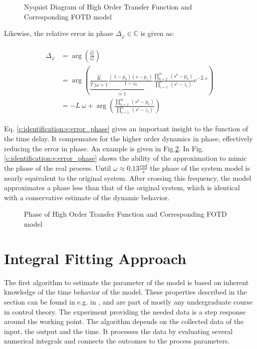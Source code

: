 \begin{figure}[H]
  \centering
  \def\svgwidth{\textwidth}
  
  \caption{Nyquist Diagram of High Order Transfer Function and Corresponding FOTD model}
  \label{c:identification:f:nyquist_fotd}
\end{figure}


Likewise, the relative error in phase $\Delta_\varphi \in \mathbb{C}$ is given as:

\begin{align}
\begin{split}
\Delta_\varphi &= \arg\left(\frac{\hat{G}}{G}\right) \\
&= \arg\left(\underbrace{\frac{\hat{K}}{\hat{T}~j\omega+1} \frac{\left(\ 1-p_0 \right)\left( s- p_1 \right)}{1-z_0}}_{\approx 1} \frac{\prod_{k=2}^m~(s^k-p_k)}{\prod_{i=1}^n~(s^i-z_i)}e^{-\hat{L}~s} \right)\\
&= -L~\omega + \arg\left(\frac{\prod_{k=2}^m~(s^k-p_k)}{\prod_{i=1}^n~(s^i-z_i)}\right)
\end{split}
\label{c:identification:e:error_phase}
\end{align}

Eq. \ref{c:identification:e:error_phase} gives an important insight to the function of the time delay. It compensates for the higher order dynamics in phase, effectively reducing the error in phase. An example is given in Fig.\ref{c:identification:f:phase_fotd}. In Fig. \ref{c:identification:e:error_phase} shows the ability of the approximation to mimic the phase of the real process. Until $\omega \approx 0.13 \frac{rad}{s}$ the phase of the system model is nearly equivalent to the original system. After crossing this frequency, the model approximates a phase less than that of the original system, which is identical with a conservative estimate of the dynamic behavior.

\begin{figure}[H]
  \centering
  \def\svgwidth{\textwidth}
  
  \caption{Phase of High Order Transfer Function and Corresponding FOTD model}
  \label{c:identification:f:phase_fotd}
\end{figure}


\section{Integral Fitting Approach}
\label{c:identification:s:area}

The first algorithm to estimate the parameter of the model is based on inherent knowledge of the time behavior of the model. These properties described in the section can be found in e.g. in \cite{Bi1999}, \cite{Fedele2009a} and are part of mostly any undergraduate course in control theory. The experiment providing the needed data is a step response around the working point. The algorithm depends on the collected data of the input, the output and the time. It processes the data by evaluating several numerical integrals and connects the outcomes to the process parameters.\\

